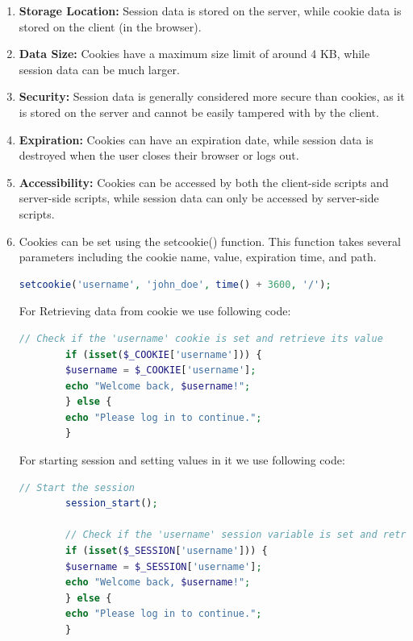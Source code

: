 \documentclass[11pt]{article}
\begin{document}
\begin{enumerate}
    \item \textbf{Storage Location:} Session data is stored on the server, while cookie data is stored on the client (in the browser).

    \item \textbf{Data Size:} Cookies have a maximum size limit of around 4 KB, while session data can be much larger.
    
    \item \textbf{Security:} Session data is generally considered more secure than cookies, as it is stored on the server and cannot be easily tampered with by the client.
    
    \item \textbf{Expiration:} Cookies can have an expiration date, while session data is destroyed when the user closes their browser or logs out.
    
    \item \textbf{Accessibility:} Cookies can be accessed by both the client-side scripts and server-side scripts, while session data can only be accessed by server-side scripts.
    \item Cookies can be set using the setcookie() function. This function takes several parameters including the cookie name, value, expiration time, and path.
    \begin{lstlisting}[language=php]
        setcookie('username', 'john_doe', time() + 3600, '/');
    \end{lstlisting}
    For Retrieving data from cookie we use following code:
    \begin{lstlisting}[language=php]
        // Check if the 'username' cookie is set and retrieve its value
        if (isset($_COOKIE['username'])) {
        $username = $_COOKIE['username'];
        echo "Welcome back, $username!";
        } else {
        echo "Please log in to continue.";
        }
    \end{lstlisting}
    For starting session and setting values in it we use following code:
    \begin{lstlisting}[language=php]
        // Start the session
        session_start();

        // Check if the 'username' session variable is set and retrieve its value
        if (isset($_SESSION['username'])) {
        $username = $_SESSION['username'];
        echo "Welcome back, $username!";
        } else {
        echo "Please log in to continue.";
        }

    \end{lstlisting}
\end{enumerate}
\end{document}
